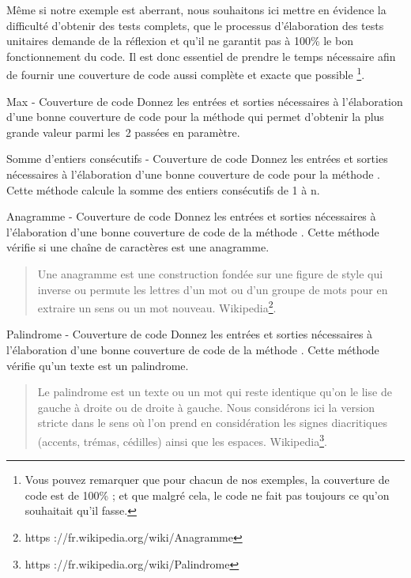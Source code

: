 \documentclass[a4paper,11pt]{style-esi/td}
\begin{document}
Même si notre exemple est aberrant,
nous souhaitons ici mettre en évidence la difficulté d'obtenir des tests complets,
que le processus d’élaboration des tests unitaires demande de la réflexion
et qu’il ne garantit pas à 100\% le bon fonctionnement du code.
Il est donc essentiel de prendre le temps nécessaire
afin de fournir une couverture de code aussi complète et exacte que possible%
\footnote{%
	Vous pouvez remarquer que pour chacun de nos exemples,
	la couverture de code est de 100\% ;
	et que malgré cela, le code ne fait pas toujours ce qu'on souhaitait qu'il fasse.
}.

\begin{Exercice}{Max - Couverture de code}
	Donnez les entrées et sorties nécessaires à l’élaboration d’une bonne
	couverture de code pour la méthode  qui
	permet d’obtenir la plus grande valeur parmi les~2 passées en
	paramètre.
\end{Exercice}

\begin{Exercice}{Somme d'entiers consécutifs - Couverture de code}
	Donnez les entrées et sorties nécessaires à l’élaboration d’une bonne couverture de code pour la méthode . Cette méthode calcule la somme des entiers consécutifs de 1 à n.
\end{Exercice}

\begin{Exercice}{Anagramme - Couverture de code}
	Donnez les entrées et sorties nécessaires à l’élaboration d’une bonne couverture de code de la méthode . Cette méthode vérifie si une chaîne de caractères est une anagramme.
	\begin{quote}
		\og Une anagramme est une construction fondée sur une figure de style qui inverse ou permute les lettres d’un mot ou d’un groupe de mots pour en extraire un sens ou un mot nouveau.\fg
		Wikipedia\footnote{https ://fr.wikipedia.org/wiki/Anagramme}.
	\end{quote}
\end{Exercice}

\begin{Exercice}{Palindrome - Couverture de code}
	Donnez les entrées et sorties nécessaires à l’élaboration d’une bonne couverture de code de la méthode . Cette méthode vérifie qu'un texte est un palindrome.
	\begin{quote}
		\og Le palindrome est un texte ou un mot qui reste identique qu’on le lise de gauche à droite ou de droite à gauche. Nous considérons ici la version stricte dans le sens où l’on prend en considération les signes diacritiques (accents, trémas, cédilles) ainsi que les espaces.\fg{} Wikipedia\footnote{https ://fr.wikipedia.org/wiki/Palindrome}.
	\end{quote}
\end{Exercice}
\end{document}
